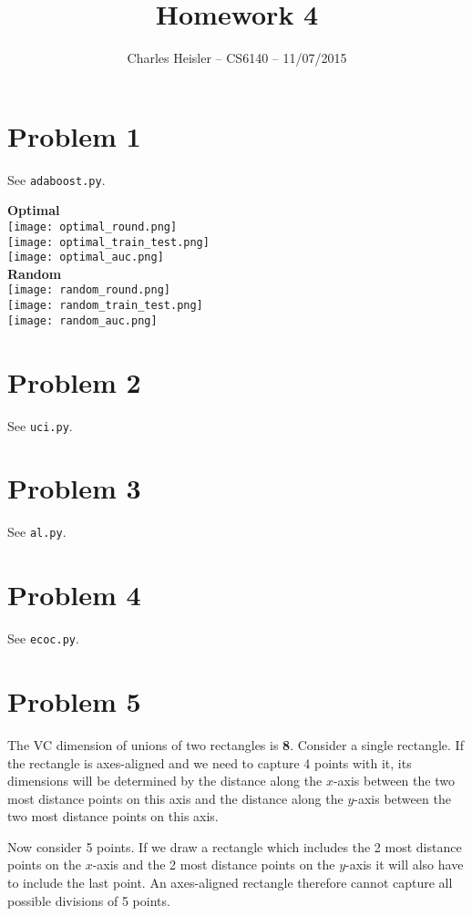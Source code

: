 \documentclass[12pt]{article}
\title{Homework 4}
\author{Charles Heisler -- CS6140 -- 11/07/2015}
\date{}
\begin{document}
\maketitle

\section*{Problem 1}
See \texttt{adaboost.py}.

\textbf{Optimal} \\
\texttt{[image: optimal\_round.png]} \\
\texttt{[image: optimal\_train\_test.png]} \\
\texttt{[image: optimal\_auc.png]} \\

\clearpage
\textbf{Random} \\
\texttt{[image: random\_round.png]} \\
\texttt{[image: random\_train\_test.png]} \\
\texttt{[image: random\_auc.png]} \\

\section*{Problem 2}
See \texttt{uci.py}.

\section*{Problem 3}
See \texttt{al.py}.

\section*{Problem 4}
See \texttt{ecoc.py}.

\section*{Problem 5}
The VC dimension of unions of two rectangles is \textbf{8}. Consider a single rectangle. If the rectangle is axes-aligned and we need to capture 4 points with it, its dimensions will be determined by the distance along the $x$-axis between the two most distance points on this axis and the distance along the $y$-axis between the two most distance points on this axis.

Now consider 5 points. If we draw a rectangle which includes the 2 most distance points on the $x$-axis and the 2 most distance points on the $y$-axis it will also have to include the last point. An axes-aligned rectangle therefore cannot capture all possible divisions of 5 points.
\end{document}
